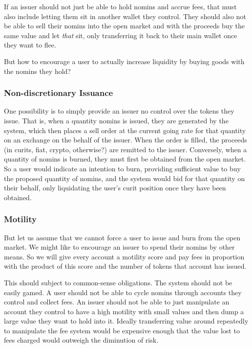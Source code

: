 \documentclass{article}
\begin{document}
If an issuer should not just be able to hold nomins and accrue fees, that must also include
letting them sit in another wallet they control. They should also not be able to sell their nomins
into the open market and with the proceeds buy the same value and let \textit{that} sit,
only transferring it back to their main wallet once they want to flee.

But how to encourage a user to actually increase liquidity by buying goods with the nomins they hold? 

\subsubsection{Non-discretionary Issuance}

One possibility is to simply provide an issuer no control over the tokens they issue.
That is, when a quantity nomins is issued, they are generated by the system, which then places a
sell order at the current going rate for that quantity on an exchange on the behalf of the issuer.
When the order is filled, the proceeds (in curits, fiat, crypto, otherwise?) are remitted to the issuer.
Conversely, when a quantity of nomins is burned, they must first be obtained from the open market.
So a user would indicate an intention to burn, providing sufficient value to buy the proposed quantity
of nomins, and the system would bid for that quantity on their behalf, only liquidating the user's
curit position once they have been obtained.

\subsubsection{Motility}

But let us assume that we cannot force a user to issue and burn from the open market.
We might like to encourage an issuer to spend their nomins by other means. So we will give every
account a motility score and pay fees in proportion with the product of this score and the
number of tokens that account has issued.

This should subject to common-sense obligations. The system should not be easily gamed.
A user should not be able to cycle nomins through accounts they control and collect fees.
An issuer should not be able to just manipulate an account they control to have a high
motility with small values and then dump a large value they want to hold into it.
Ideally transferring value around repeatedly to manipulate the fee system would be expensive 
enough that the value lost to fees charged would outweigh the diminution of risk.
\end{document}
